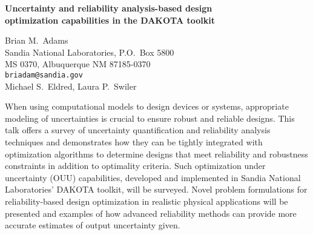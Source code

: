 \documentclass{report}
\begin{document}
\begin{center}
{\large
{\bf Uncertainty and reliability analysis-based design \\
optimization capabilities in the DAKOTA toolkit }}

	Brian M.~Adams \\
	Sandia National Laboratories, P.O.~Box 5800 \\
	MS 0370, Albuquerque NM 87185-0370 \\
	{\tt briadam@sandia.gov} \\
	Michael S.~Eldred, Laura P.~Swiler
\end{center}
When using computational models to design devices or systems,
appropriate modeling of uncertainties is crucial to ensure robust and
reliable designs.  This talk offers a survey of uncertainty
quantification and reliability analysis techniques and demonstrates
how they can be tightly integrated with optimization algorithms to
determine designs that meet reliability and robustness constraints in
addition to optimality criteria.  Such optimization under uncertainty
(OUU) capabilities, developed and implemented in Sandia National
Laboratories' DAKOTA toolkit, will be surveyed.  Novel problem
formulations for reliability-based design optimization in realistic
physical applications will be presented and examples of how advanced
reliability methods can provide more accurate estimates of output
uncertainty given.



\end{document}

